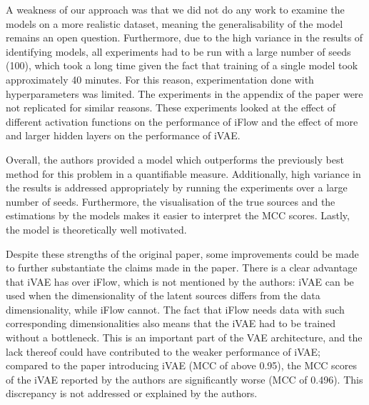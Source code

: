 A weakness of our approach was that we did not do any work to examine the models on a more realistic dataset, meaning the generalisability of the model remains an open question. Furthermore, due to the high variance in the results of identifying models, all experiments had to be run with a large number of seeds (100), which took a long time given the fact that training of a single model took approximately 40 minutes. For this reason, experimentation done with hyperparameters was limited. The experiments in the appendix of the paper were not replicated for similar reasons. These experiments looked at the effect of different activation functions on the performance of iFlow and the effect of more and larger hidden layers on the performance of iVAE.

Overall, the authors provided a model which outperforms the previously best method for this problem in a quantifiable measure. Additionally, high variance in the results is addressed appropriately by running the experiments over a large number of seeds. Furthermore, the visualisation of the true sources and the estimations by the models makes it easier to interpret the MCC scores. Lastly, the model is theoretically well motivated.

Despite these strengths of the original paper, some improvements could be made to further substantiate the claims made in the paper.
There is a clear advantage that iVAE has over iFlow, which is not mentioned by the authors: iVAE can be used when the dimensionality of the latent sources differs from the data dimensionality, while iFlow cannot. The fact that iFlow needs data with such corresponding dimensionalities also means that the iVAE had to be trained without a bottleneck. This is an important part of the VAE architecture, and the lack thereof could have contributed to the weaker performance of iVAE; compared to the paper introducing iVAE (MCC of above 0.95), the MCC scores of the iVAE reported by the authors are significantly worse (MCC of 0.496). This discrepancy is not addressed or explained by the authors.

